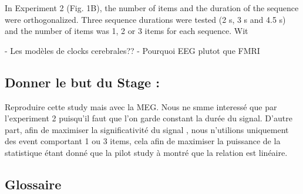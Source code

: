 In Experiment 2 (Fig. 1B), the number of items and the duration of the sequence were orthogonalized. Three sequence durations were tested (2 s, 3 s and 4.5 s) and the number of items was 1, 2 or 3 items for each sequence. Wit

- Les modèles de clocks cerebrales??
- Pourquoi EEG plutot que FMRI

\subsection{Donner le but du Stage :}

Reproduire cette study mais avec la MEG. Nous ne smme interessé que par l'experiment 2 puisqu'il faut que l'on garde constant la durée du signal.
D'autre part, afin de maximiser la significativité du signal , nous n'utilions uniquement des event  comportant 1 ou 3 items, cela afin de maximiser la puissance de la statistique étant donné que la pilot study à montré que la relation est linéaire.

\subsection{Glossaire}

